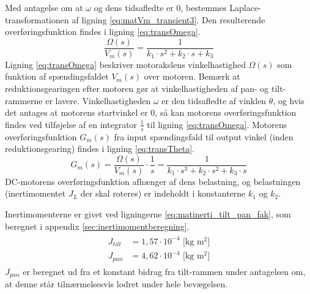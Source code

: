 Med antagelse om at \(\omega\) og dens tidsafledte er 0,
bestemmes Laplace-transformationen af ligning \ref{eq:matVm_transient3}.
Den resulterende overføringsfunktion findes i ligning \ref{eq:transOmega}.
\begin{equation}
	\frac{\Omega\left(s\right)}{V_m\left(s\right)}=\frac{1}{k_1\cdot{}s^2+k_2\cdot{}s+k_3}
	\label{eq:transOmega}
 \end{equation}
Ligning \ref{eq:transOmega} beskriver motorakslens vinkelhastighed \(\Omega\left(s\right)\) som funktion af spændingsfaldet
\(V_m\left(s\right)\) over motoren. Bemærk at reduktionsgearingen efter motoren gør at vinkelhastigheden af pan- og tilt-rammerne er lavere.
Vinkelhastigheden \(\omega\) er den tidsafledte af vinklen \(\theta\),
og hvis det antages at motorens startvinkel er 0, så kan motorens overføringsfunktion
findes ved tilføjelse af en integrator \(\frac{1}{s}\) til ligning \ref{eq:transOmega}.
Motorens overføringsfunktion \(G_m\left(s\right)\) fra input spændingsfald til output vinkel (inden reduktionsgearing) findes
i ligning \ref{eq:transTheta}.
\begin{equation}
	G_m\left(s\right)=\frac{\Omega\left(s\right)}{V_m\left(s\right)}\cdot{}\frac{1}{s}=\frac{1}{k_1\cdot{}s^3+k_2\cdot{}s^2+k_3\cdot{}s}
	\label{eq:transTheta}
\end{equation}
DC-motorens overføringsfunktion afhænger af dens belastning,
og belastningen (inertimomentet \(J_L\) der skal roteres) er indeholdt i konstanterne \(k_1\) og \(k_2\).

Inertimomenterne er givet ved ligningerne \ref{eq:matinerti_tilt_pan_fak},
som beregnet i appendix \ref{sec:inertimomentberegning}.
\begin{align}
\label{eq:matinerti_tilt_pan_fak}
\begin{split}
{J_{tilt}}&=1,57%
\cdot{10}^{-4} \text{ [kg m$^2$]}
\\
{J_{pan}}&=4,62%
\cdot{10}^{-4} \text{ [kg m$^2$]}
\end{split}
\end{align}
\(J_{pan}\) er beregnet ud fra et konstant bidrag fra tilt-rammen under antagelsen om,
at denne står tilnærmelsesvis lodret under hele bevægelsen.

